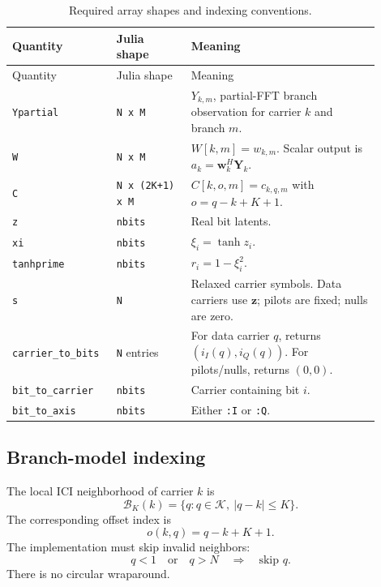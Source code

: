 \documentclass[11pt]{article}
\begin{document}
\begin{longtable}{@{}p{0.23\linewidth}p{0.19\linewidth}p{0.48\linewidth}@{}}
\caption{Required array shapes and indexing conventions.}\label{tab:layout}\\
\toprule
Quantity & Julia shape & Meaning \\
\midrule
\endfirsthead
\toprule
Quantity & Julia shape & Meaning \\
\midrule
\endhead
\bottomrule
\endfoot
\texttt{Ypartial} & \texttt{N x M} & $Y_{k,m}$, partial-FFT branch observation for carrier $k$ and branch $m$. \\
\texttt{W} & \texttt{N x M} & $W[k,m]=w_{k,m}$.  Scalar output is $a_k=\mathbf w_k^H\mathbf Y_k$. \\
\texttt{C} & \texttt{N x (2K+1) x M} & $C[k,o,m]=c_{k,q,m}$ with $o=q-k+K+1$. \\
\texttt{z} & \texttt{nbits} & Real bit latents. \\
\texttt{xi} & \texttt{nbits} & $\xi_i=\tanh z_i$. \\
\texttt{tanhprime} & \texttt{nbits} & $r_i=1-\xi_i^2$. \\
\texttt{s} & \texttt{N} & Relaxed carrier symbols.  Data carriers use $\bm z$; pilots are fixed; nulls are zero. \\
\texttt{carrier\_to\_bits} & \texttt{N} entries & For data carrier $q$, returns $(i_I(q),i_Q(q))$.  For pilots/nulls, returns $(0,0)$. \\
\texttt{bit\_to\_carrier} & \texttt{nbits} & Carrier containing bit $i$. \\
\texttt{bit\_to\_axis} & \texttt{nbits} & Either \texttt{:I} or \texttt{:Q}. \\
\end{longtable}

\subsection{Branch-model indexing}

The local ICI neighborhood of carrier $k$ is
\begin{equation}
\mathcal B_K(k)=\{q: q\in\mathcal K,\ |q-k|\le K\}.
\end{equation}
The corresponding offset index is
\begin{equation}
 o(k,q)=q-k+K+1.
\end{equation}
The implementation must skip invalid neighbors:
\begin{equation}
q<1 \quad\text{or}\quad q>N \quad\Longrightarrow\quad \text{skip } q.
\end{equation}
There is no circular wraparound.
\end{document}
